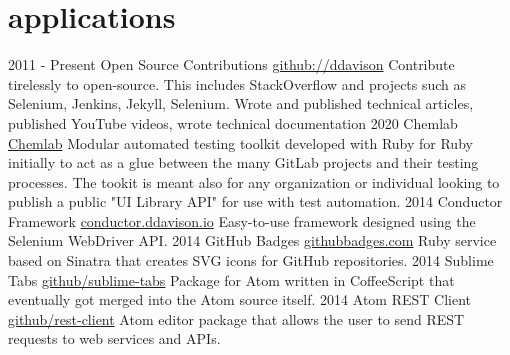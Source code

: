 \documentclass[]{ddavison-resume}
\begin{document}
\section{applications}

\begin{entrylist}
  \entry
    {2011 - Present}
    {Open Source Contributions}
    {\href{https://github.com/ddavison}{github://ddavison}}
    {Contribute tirelessly to open-source.  This includes StackOverflow and projects such as Selenium, Jenkins, Jekyll, Selenium. Wrote and published technical articles, published YouTube videos, wrote technical documentation}
  \entry
    {2020}
    {Chemlab}
    {\href{https://gitlab.com/gitlab-org/quality/chemlab}{Chemlab}}
    {Modular automated testing toolkit developed with Ruby for Ruby initially to act as a glue between the many GitLab projects and their testing processes.  The tookit is meant also for any organization or individual looking to publish a public "UI Library API" for use with test automation.}
  \entry
    {2014}
    {Conductor Framework}
    {\href{https://conductor.ddavison.io}{conductor.ddavison.io}}
    {Easy-to-use framework designed using the Selenium WebDriver API.}
  \entry
    {2014}
    {GitHub Badges}
    {\href{https://github.com/ddavison/github-badges}{githubbadges.com}}
    {Ruby service based on Sinatra that creates SVG icons for GitHub repositories.}
  \entry
    {2014}
    {Sublime Tabs}
    {\href{https://github.com/ddavison/sublime-tabs}{github/sublime-tabs}}
    {Package for Atom written in CoffeeScript that eventually got merged into the Atom source itself.}
  \entry
  	{2014}
  	{Atom REST Client}
  	{\href{https://github.com/ddavison/rest-client}{github/rest-client}}
  	{Atom editor package that allows the user to send REST requests to web services and APIs.}
\end{entrylist}
\end{document}

